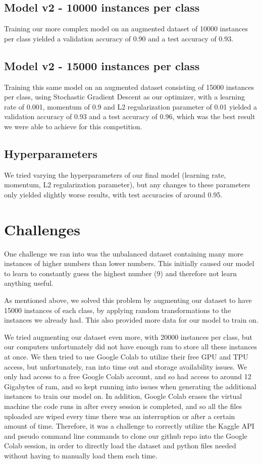 \documentclass[12pt]{article}
\begin{document}
\subsection{Model v2 - 10000 instances per class}
Training our more complex model on an augmented dataset of 10000 instances per class yielded a validation accuracy of 0.90 and a test accuracy of 0.93.

\subsection{Model v2 - 15000 instances per class}
Training this same model on an augmented dataset consisting of 15000 instances per class, using Stochastic Gradient Descent as our optimizer, with a learning rate of 0.001, momentum of 0.9 and L2 regularization parameter of 0.01 yielded a validation accuracy of 0.93 and a test accuracy of 0.96, which was the best result we were able to achieve for this competition.

\subsection{Hyperparameters}
We tried varying the hyperparameters of our final model (learning rate, momentum, L2 regularization parameter), but any changes to these parameters only yielded slightly worse results, with test accuracies of around 0.95.
\section{Challenges}
One challenge we ran into was the unbalanced dataset containing many more instances of higher numbers than lower numbers. This initially caused our model to learn to constantly guess the highest number (9) and therefore not learn anything useful. 

As mentioned above, we solved this problem by augmenting our dataset to have 15000 instances of each class, by applying random transformations to the instances we already had. This also provided more data for our model to train on.

We tried augmenting our dataset even more, with 20000 instances per class, but our computers unfortunately did not have enough ram to store all these instances at once. We then tried to use Google Colab to utilize their free GPU and TPU access, but unfortunately, ran into time out and storage availability issues. We only had access to a free Google Colab account, and so had access to around 12 Gigabytes of ram, and so kept running into issues when generating the additional instances to train our model on. In addition, Google Colab erases the virtual machine the code runs in after every session is completed, and so all the files uploaded are wiped every time there was an interruption or after a certain amount of time. Therefore, it was a challenge to correctly utilize the Kaggle API and pseudo command line commands to clone our github repo into the Google Colab session, in order to directly load the dataset and python files needed without having to manually load them each time.     
\end{document}
